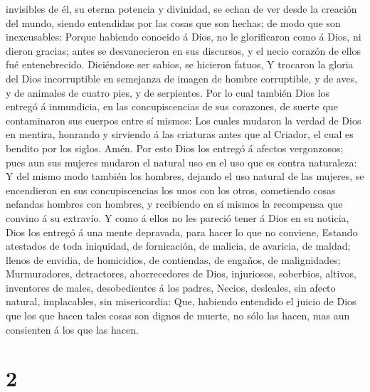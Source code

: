invisibles de él, su eterna potencia y divinidad, se echan de ver desde
la creación del mundo, siendo entendidas por las cosas que son hechas;
de modo que son inexcusables:  Porque habiendo conocido á
Dios, no le glorificaron como á Dios, ni dieron gracias; antes se
desvanecieron en sus discursos, y el necio corazón de ellos fué
entenebrecido.  Diciéndose ser sabios, se hicieron fatuos,
 Y trocaron la gloria del Dios incorruptible en semejanza
de imagen de hombre corruptible, y de aves, y de animales de cuatro
pies, y de serpientes.  Por lo cual también Dios los
entregó á inmundicia, en las concupiscencias de sus corazones, de suerte
que contaminaron sus cuerpos entre sí mismos:  Los cuales
mudaron la verdad de Dios en mentira, honrando y sirviendo á las
criaturas antes que al Criador, el cual es bendito por los siglos. Amén.
 Por esto Dios los entregó á afectos vergonzosos; pues aun
sus mujeres mudaron el natural uso en el uso que es contra naturaleza:
 Y del mismo modo también los hombres, dejando el uso
natural de las mujeres, se encendieron en sus concupiscencias los unos
con los otros, cometiendo cosas nefandas hombres con hombres, y
recibiendo en sí mismos la recompensa que convino á su extravío.
 Y como á ellos no les pareció tener á Dios en su noticia,
Dios los entregó á una mente depravada, para hacer lo que no conviene,
 Estando atestados de toda iniquidad, de fornicación, de
malicia, de avaricia, de maldad; llenos de envidia, de homicidios, de
contiendas, de engaños, de malignidades;  Murmuradores,
detractores, aborrecedores de Dios, injuriosos, soberbios, altivos,
inventores de males, desobedientes á los padres,  Necios,
desleales, sin afecto natural, implacables, sin misericordia:
 Que, habiendo entendido el juicio de Dios que los que
hacen tales cosas son dignos de muerte, no sólo las hacen, mas aun
consienten á los que las hacen.

\hypertarget{section-1}{%
\section{2}\label{section-1}}

